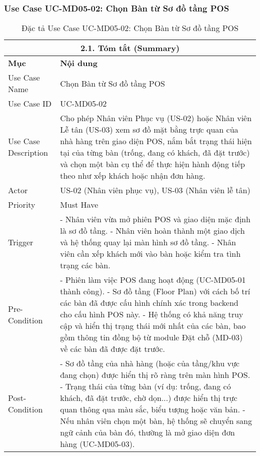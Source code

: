 \subsubsection{Use Case UC-MD05-02: Chọn Bàn từ Sơ đồ tầng POS}
\begin{longtable}{|m{4cm}|p{11cm}|}
\caption{Đặc tả Use Case UC-MD05-02: Chọn Bàn từ Sơ đồ tầng POS} \label{tab:uc_md05_02_final} \\
\hline
\multicolumn{2}{|c|}{\textbf{2.1. Tóm tắt (Summary)}} \\
\hline
\textbf{Mục} & \textbf{Nội dung} \\
\hline
\endhead %
\hline
\endfoot %
\hline
\endlastfoot %
Use Case Name & Chọn Bàn từ Sơ đồ tầng POS \\
\hline
Use Case ID & UC-MD05-02 \\
\hline
Use Case Description & Cho phép Nhân viên Phục vụ (US-02) hoặc Nhân viên Lễ tân (US-03) xem sơ đồ mặt bằng trực quan của nhà hàng trên giao diện POS, nắm bắt trạng thái hiện tại của từng bàn (trống, đang có khách, đã đặt trước) và chọn một bàn cụ thể để thực hiện hành động tiếp theo như xếp khách hoặc nhận đơn hàng. \\
\hline
Actor & US-02 (Nhân viên phục vụ), US-03 (Nhân viên lễ tân) \\
\hline
Priority & Must Have \\
\hline
Trigger & - Nhân viên vừa mở phiên POS và giao diện mặc định là sơ đồ tầng. \newline - Nhân viên hoàn thành một giao dịch và hệ thống quay lại màn hình sơ đồ tầng. \newline - Nhân viên cần xếp khách mới vào bàn hoặc kiểm tra tình trạng các bàn. \\
\hline
Pre-Condition & - Phiên làm việc POS đang hoạt động (UC-MD05-01 thành công). \newline - Sơ đồ tầng (Floor Plan) với cách bố trí các bàn đã được cấu hình chính xác trong backend cho cấu hình POS này. \newline - Hệ thống có khả năng truy cập và hiển thị trạng thái mới nhất của các bàn, bao gồm thông tin đồng bộ từ module Đặt chỗ (MD-03) về các bàn đã được đặt trước. \\
\hline
Post-Condition & - Sơ đồ tầng của nhà hàng (hoặc của tầng/khu vực đang chọn) được hiển thị rõ ràng trên màn hình POS. \newline - Trạng thái của từng bàn (ví dụ: trống, đang có khách, đã đặt trước, chờ dọn...) được hiển thị trực quan thông qua màu sắc, biểu tượng hoặc văn bản. \newline - Nếu nhân viên chọn một bàn, hệ thống sẽ chuyển sang ngữ cảnh của bàn đó, thường là mở giao diện đơn hàng (UC-MD05-03). \\

\end{longtable}
